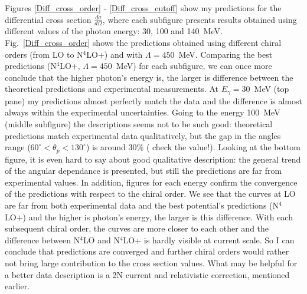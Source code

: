     Figures \ref{Diff_cross_order} - \ref{Diff_cross_cutoff} show my predictions for the differential cross section
    $\frac{d\sigma}{d\Omega}$, where each subfigure 
    presents results obtained using different values of the photon energy:
    30, 100 and 140~MeV. 
    Fig.~\ref{Diff_cross_order} shows the predictions obtained using 
    different chiral orders (from LO to N$^4$LO+) and with $\Lambda=450$~MeV.
    Comparing the best predictions (N$^4$LO+, $\Lambda=450$~MeV) for each
    subfigure, we can once more 
    conclude that the higher photon's energy is, the larger is 
    difference between the theoretical predictions and experimental 
    measurements. At $E_\gamma = 30$~MeV (top pane) my predictions
    almost perfectly match the data and the difference is almost always
    within the experimental uncertainties. Going to the energy 100~MeV (middle subfigure)
    the descriptions seems not to be such good: theoretical
    predictions match experimental data qualitatively, but
    the gap in the angles range ($60^{\circ} < \theta_p < 130^{\circ}$) 
    is around 30\% ({\color{red} check the value!}).
    Looking at the bottom figure, it is even hard to say about 
    good qualitative description: the general trend of the
    angular dependance is presented, but still the predictions are 
    far from experimental values.
    In addition, figures for each energy confirm the convergence 
    of the predictions with respect to the chiral order.
    We see that the curves at LO are far from both experimental 
    data and the best potential's predictions (N$^4$LO+) and
    the higher is photon's energy, the larger is this
    difference. With each subsequent chiral order, the 
    curves are more closer to each other and the difference
    between N$^4$LO and N$^4$LO+ is hardly visible at current scale.
    So I can conclude that predictions are converged and 
    further chiral orders would rather not bring large contribution 
    to the cross section values. What may be helpful
    for a better data description is a 2N current 
    and relativistic correction, mentioned earlier.

